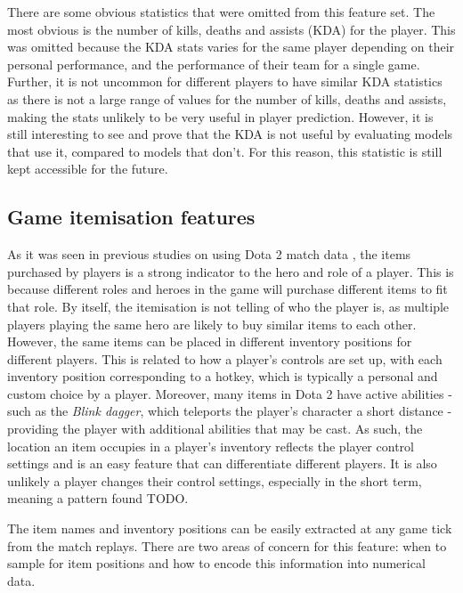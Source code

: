 \documentclass[Report.tex]{subfiles}
\begin{document}
There are some obvious statistics that were omitted from this feature set. The most obvious is the number of kills, deaths and assists (KDA) for the player. This was omitted because the KDA stats varies for the same player depending on their personal performance, and the performance of their team for a single game. Further, it is not uncommon for different players to have similar KDA statistics as there is not a large range of values for the number of kills, deaths and assists, making the stats unlikely to be very useful in player prediction. However, it is still interesting to see and prove that the KDA is not useful by evaluating models that use it, compared to models that don't. For this reason, this statistic is still kept accessible for the future. 


\subsection{Game itemisation features}
As it was seen in previous studies on using Dota 2 match data \cite{dota-gao, dota-eggert}, the items purchased by players is a strong indicator to the hero and role of a player. This is because different roles and heroes in the game will purchase different items to fit that role. By itself, the itemisation is not telling of who the player is, as multiple players playing the same hero are likely to buy similar items to each other. However, the same items can be placed in different inventory positions for different players. This is related to how a player's controls are set up, with each inventory position corresponding to a hotkey, which is typically a personal and custom choice by a player. Moreover, many items in Dota 2 have active abilities - such as the \textit{Blink dagger}, which teleports the player's character a short distance - providing the player with additional abilities that may be cast. As such, the location an item occupies in a player's inventory reflects the player control settings and is an easy feature that can differentiate different players. It is also unlikely a player changes their control settings, especially in the short term, meaning a pattern found TODO. 


The item names and inventory positions can be easily extracted at any game tick from the match replays. There are two areas of concern for this feature: when to sample for item positions and how to encode this information into numerical data. 
\end{document}
